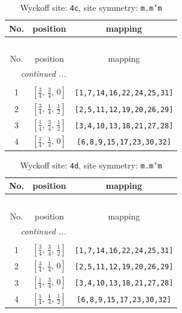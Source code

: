 \documentclass[fleqn,8pt]{jsarticle}
\begin{document}
\renewcommand{\arraystretch}{1.2}
\begin{longtable}{ccc}
\caption{Wyckoff site: {\tt 4c}, site symmetry: {\tt m.m'm}}
 \\
 \hline \hline
No. & position & mapping \\ \hline \endfirsthead

\multicolumn{2}{l}{\tablename\ \thetable{}} \\
 \hline \hline
No. & position & mapping \\ \hline \endhead

 \hline \hline
\multicolumn{2}{r}{\footnotesize\it continued ...} \\ \endfoot

 \hline \hline
\multicolumn{2}{r}{} \\ \endlastfoot

1 & $\left[ \frac{3}{4},\, \frac{3}{4},\, 0 \right]$ & {\tt [1,7,14,16,22,24,25,31]} \\ \hline
2 & $\left[ \frac{3}{4},\, \frac{1}{4},\, \frac{1}{2} \right]$ & {\tt [2,5,11,12,19,20,26,29]} \\ \hline
3 & $\left[ \frac{1}{4},\, \frac{3}{4},\, \frac{1}{2} \right]$ & {\tt [3,4,10,13,18,21,27,28]} \\ \hline
4 & $\left[ \frac{1}{4},\, \frac{1}{4},\, 0 \right]$ & {\tt [6,8,9,15,17,23,30,32]} \\
\end{longtable}
\renewcommand{\arraystretch}{1.2}
\begin{longtable}{ccc}
\caption{Wyckoff site: {\tt 4d}, site symmetry: {\tt m.m'm}}
 \\
 \hline \hline
No. & position & mapping \\ \hline \endfirsthead

\multicolumn{2}{l}{\tablename\ \thetable{}} \\
 \hline \hline
No. & position & mapping \\ \hline \endhead

 \hline \hline
\multicolumn{2}{r}{\footnotesize\it continued ...} \\ \endfoot

 \hline \hline
\multicolumn{2}{r}{} \\ \endlastfoot

1 & $\left[ \frac{3}{4},\, \frac{3}{4},\, \frac{1}{2} \right]$ & {\tt [1,7,14,16,22,24,25,31]} \\ \hline
2 & $\left[ \frac{3}{4},\, \frac{1}{4},\, 0 \right]$ & {\tt [2,5,11,12,19,20,26,29]} \\ \hline
3 & $\left[ \frac{1}{4},\, \frac{3}{4},\, 0 \right]$ & {\tt [3,4,10,13,18,21,27,28]} \\ \hline
4 & $\left[ \frac{1}{4},\, \frac{1}{4},\, \frac{1}{2} \right]$ & {\tt [6,8,9,15,17,23,30,32]} \\
\end{longtable}
\end{document}
